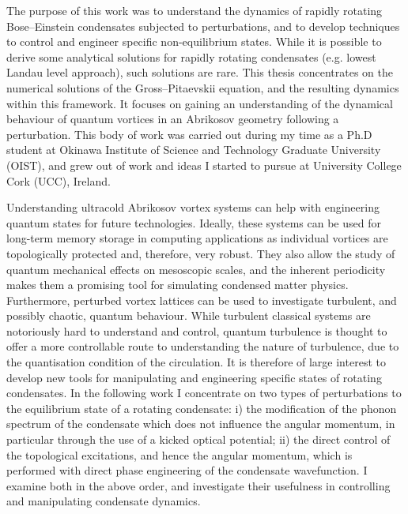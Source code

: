 
The purpose of this work was to understand the dynamics of rapidly rotating Bose--Einstein condensates subjected to perturbations, and to develop techniques to control and engineer specific non-equilibrium states. While it is possible to derive some analytical solutions for rapidly rotating condensates (e.g. lowest Landau level approach), such solutions are rare. This thesis concentrates on the numerical solutions of the Gross--Pitaevskii equation, and the resulting dynamics within this framework. It focuses on gaining an understanding of the dynamical behaviour of quantum vortices in an Abrikosov geometry following a perturbation. %
This body of work was carried out during my time as a Ph.D student at Okinawa Institute of Science and Technology Graduate University (OIST), and grew out of work and ideas I started to pursue at University College Cork (UCC), Ireland.

Understanding ultracold Abrikosov vortex systems can help with engineering quantum states for future technologies. Ideally, these systems can be used for long-term memory storage in computing applications as individual vortices are topologically protected and, therefore, very robust. They also allow the study of quantum mechanical effects on mesoscopic scales, and the inherent periodicity makes them a promising tool for simulating condensed matter physics. Furthermore, perturbed vortex lattices can be used to investigate turbulent, and possibly chaotic, quantum behaviour. While turbulent classical systems are notoriously hard to understand and control, quantum turbulence is thought to offer a more controllable route to understanding the nature of turbulence, due to the quantisation condition of the circulation. It is therefore of large interest to develop new tools for manipulating and engineering specific states of rotating condensates. In the following work I concentrate on two types of perturbations to the equilibrium state of a rotating condensate: i) the modification of the phonon spectrum of the condensate which does not influence the angular momentum, in particular through the use of a kicked optical potential; ii) the direct control of the topological excitations, and hence the angular momentum, which is performed with direct phase engineering of the condensate wavefunction. I examine both in the above order, and investigate their usefulness in controlling and manipulating condensate dynamics.

